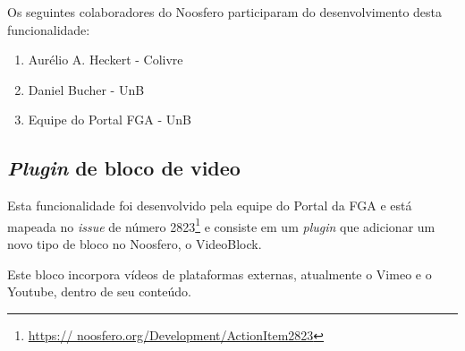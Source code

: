 Os seguintes colaboradores do Noosfero participaram do desenvolvimento desta
funcionalidade:

\begin{enumerate}

\item Aurélio A. Heckert - Colivre

\item Daniel Bucher - UnB

\item Equipe do Portal FGA - UnB

\end{enumerate}

\subsection{\textit{Plugin} de bloco de video}

Esta funcionalidade foi desenvolvido pela equipe do Portal
da FGA e está mapeada no \textit{issue} de número 2823\footnote{\url{https://
noosfero.org/Development/ActionItem2823}} e consiste em um \textit{plugin}
que adicionar um novo tipo de bloco no Noosfero, o VideoBlock.

Este bloco incorpora vídeos de plataformas externas, atualmente o Vimeo
e o Youtube, dentro de seu conteúdo.

